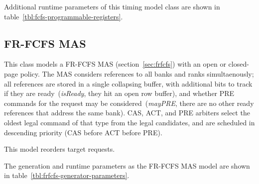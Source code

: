 \noindent Additional runtime parameters of this timing model class are shown in
table~\ref{tbl:fcfs-programmable-registers}.

\begin{table}[htb]
\begin{center}
\end{center}
\caption{Programmable registers of the FCFS MAS model.}
\label{tbl:fcfs-programmable-registers}
\end{table}%

\subsection{FR-FCFS MAS} This class models a FR-FCFS MAS
(section~\ref{sec:frfcfs}) with an open or closed-page policy. The MAS considers
references to all banks and ranks simultaenously; all references are stored in
a single collapsing buffer, with additional bits to track if they are
ready~(\emph{isReady}, they hit an open row buffer), and whether PRE
commands for the request may be considered~(\emph{mayPRE}, there are no other
ready references that address the same bank). CAS, ACT, and PRE arbiters select
the oldest legal command of that type from the legal candidates, and are
scheduled in descending priority (CAS before ACT before PRE).

This model reorders target requests.

The generation and runtime parameters as the FR-FCFS MAS model are shown
in table~\ref{tbl:frfcfs-generator-parameters}.

\begin{table}[htb]
\begin{center}
\end{center}
\caption{Generation parameters of the FR-FCFS MAS model.}
\label{tbl:frfcfs-generator-parameters}
\end{table}%

